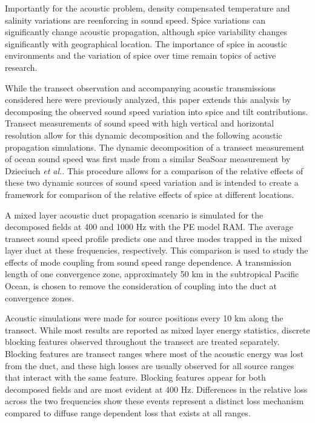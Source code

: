 \documentclass[preprint,NumberedRefs]{JASA}
\begin{document}
Importantly for the acoustic problem, density compensated temperature and salinity variations are reenforcing in sound speed. Spice variations can significantly change acoustic propagation, although spice variability changes significantly with geographical location\citep{colosi12,colosi13,murat2021}. The importance of spice in acoustic environments and the variation of spice over time remain topics of active research.

While the transect observation and accompanying acoustic transmissions considered here were previously analyzed\citep{colosi2020observations}, this paper extends this analysis by decomposing the observed sound speed variation into spice and tilt contributions. Transect measurements of sound speed with high vertical and horizontal resolution allow for this dynamic decomposition and the following acoustic propagation simulations. The dynamic decomposition of a transect measurement of ocean sound speed was first made from a similar SeaSoar measurement by Dzieciuch \emph{et al.}\citep{dzieciuch2004}. This procedure allows for a comparison of the relative effects of these two dynamic sources of sound speed variation and is intended to create a framework for comparison of the relative effects of spice at different locations.

A mixed layer acoustic duct propagation scenario is simulated for the decomposed fields at 400 and 1000 Hz with the PE model RAM\cite{collins93}. The average transect sound speed profile predicts one and three modes trapped in the mixed layer duct at these frequencies, respectively. This comparison is used to study the effects of mode coupling from sound speed range dependence. A transmission length of one convergence zone\citep{jensen2011computational}, approximately 50 km in the subtropical Pacific Ocean, is chosen to remove the consideration of coupling into the duct at convergence zones\citep{colosi2020observations}.

Acoustic simulations were made for source positions every 10 km along the transect. While most results are reported as mixed layer energy statistics, discrete blocking features\citep{colosi2020observations} observed throughout the transect are treated separately. Blocking features are transect ranges where most of the acoustic energy was lost from the duct, and these high losses are usually observed for all source ranges that interact with the same feature. Blocking features appear for both decomposed fields and are most evident at 400 Hz. Differences in the relative loss across the two frequencies show these events represent a distinct loss mechanism compared to diffuse range dependent loss that exists at all ranges.
\end{document}
